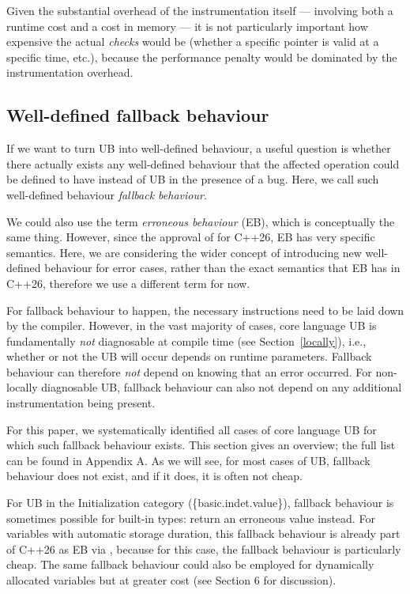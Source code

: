 Given the substantial overhead of the instrumentation itself --- involving both a runtime cost and a cost in memory --- it is not particularly important how expensive the actual \emph{checks} would be (whether a specific pointer is valid at a specific time, etc.), because the performance penalty would be dominated by the instrumentation overhead.

\subsection{Well-defined fallback behaviour}
\label{fallback}

If we want to turn UB into well-defined behaviour, a useful question is whether there actually exists any well-defined behaviour that the affected operation could be defined to have instead of UB in the presence of a bug. Here, we call such well-defined behaviour \emph{fallback behaviour}.

We could also use the term \emph{erroneous behaviour} (EB), which is conceptually the same thing. However, since the approval of \cite{P2795R5} for C++26, EB has very specific semantics. Here, we are considering the wider concept of introducing new well-defined behaviour for error cases, rather than the exact semantics that EB has in C++26, therefore we use a different term for now.

For fallback behaviour to happen, the necessary instructions need to be laid down by the compiler. However, in the vast majority of cases, core language UB is fundamentally \emph{not} diagnosable at compile time (see Section~\ref{locally}), i.e., whether or not the UB will occur depends on runtime parameters. Fallback behaviour can therefore \emph{not} depend on knowing that an error occurred. For non-locally diagnosable UB, fallback behaviour can also not depend on any additional instrumentation being present.

For this paper, we systematically identified all cases of core language UB for which such fallback behaviour exists. This section gives an overview; the full list can be found in Appendix A. As we will see, for most cases of UB, fallback behaviour does not exist, and if it does, it is often not cheap.

For UB in the Initialization category (\{basic.indet.value\}), fallback behaviour is sometimes possible for built-in types: return an erroneous value instead. For variables with automatic storage duration, this fallback behaviour is already part of C++26 as EB via \cite{P2795R5}, because for this case, the fallback behaviour is particularly cheap. The same fallback behaviour could also be employed for dynamically allocated variables but at greater cost (see \cite{P2723R1} Section 6 for discussion).


